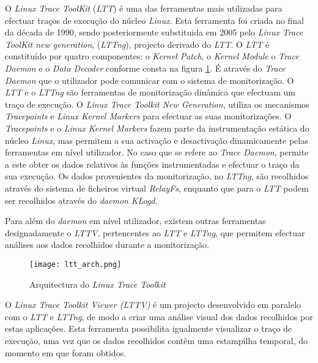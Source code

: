 O \textit{Linux Trace ToolKit} (\textit{LTT}) é uma das ferramentas mais utilizadas para efectuar traços de execução do núcleo \textit{Linux}.
Esta ferramenta foi criada no final da década de 1990, sendo posteriormente substituida em 2005 pelo \textit{Linux Trace ToolKit new generation}, (\textit{LTTng}), projecto derivado do \textit{LTT}.
O \textit{LTT} é constituído por quatro componentes: o \textit{Kernel Patch}, o \textit{Kernel Module} o \textit{Trace Daemon} e o \textit{Data Decoder} conforme consta na figura \ref{fig:ltt_arch}.
É através do \textit{Trace Daemon} que o utilizador pode comunicar com o sistema de monitorização.
O \textit{LTT} e o \textit{LTTng} são ferramentas de monitorização dinâmica que efectuam um traço de execução.
O \textit{Linux Trace Toolkit New Generation}, utiliza os mecanismos \textit{Tracepoints}\cite{Mathieu2009} e \textit{Linux Kernel Markers}\cite{Mathieu2009} para efectuar as suas monitorizações.
O \textit{Tracepoints} e o \textit{Linux Kernel Markers} fazem parte da instrumentação estática do núcleo \textit{Linux}, mas permitem a sua activação e desactivação dinamicamente pelas ferramentas em nível utilizador.
No caso que se refere ao \textit{Trace Daemon}, permite a este obter os dados relativos às funções instrumentadas e efectuar o traço da sua execução.
Os dados provenientes da monitorização, no \textit{LTTng}, são recolhidos através do sistema de ficheiros virtual \textit{RelayFs}, enquanto que para o \textit{LTT} podem ser recolhidos através do \textit{daemon} \textit{KLogd}.

Para além do \textit{daemon} em nível utilizador, existem outras ferramentas designadamente o \textit{LTTV}, pertencentes ao \textit{LTT} e \textit{LTTng}, que permitem efectuar análises aos dados recolhidos durante a monitorização.

\begin{figure}[!htb]
       \centering
       \texttt{[image: ltt\_arch.png]}
       \caption{Arquitectura do \textit{Linux Trace Toolkit} \cite{Yaghmour:2000:MCS:1267724.1267726}}
	\label{fig:ltt_arch}
\end{figure}

O \textit{Linux Trace Toolkit Viewer (LTTV)} é um projecto desenvolvido em paralelo com o \textit{LTT} e \textit{LTTng}, de modo a criar uma análise visual dos dados recolhidos por estas aplicações.
Esta ferramenta possibilita igualmente visualizar o traço de execução, uma vez que os dados recolhidos contêm uma estampilha temporal, do momento em que foram obtidos.

